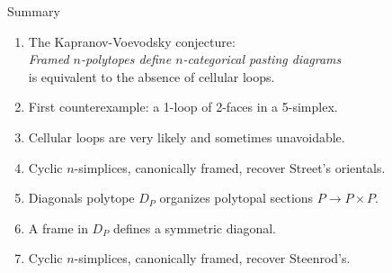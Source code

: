 \begin{frame}{Summary}
	\begin{enumerate}
		\item\pause The Kapranov-Voevodsky conjecture:\\
		\smallskip
		\textit{Framed $n$-polytopes define $n$-categorical pasting diagrams}\\
		\smallskip
		is equivalent to the absence of cellular loops.
		
		\item\pause First counterexample: a 1-loop of 2-faces in a 5-simplex.
		
		\item\pause Cellular loops are very likely and sometimes unavoidable.
		
		\item\pause Cyclic $n$-simplices, canonically framed, recover Street's orientals.
		
		
		\item\pause Diagonals polytope $D_P$ organizes polytopal sections $P \to P \times P$.
		
		\item\pause A frame in $D_P$ defines a symmetric diagonal.
		
		\item\pause Cyclic $n$-simplices, canonically framed, recover Steenrod's.
	\end{enumerate}
\end{frame}